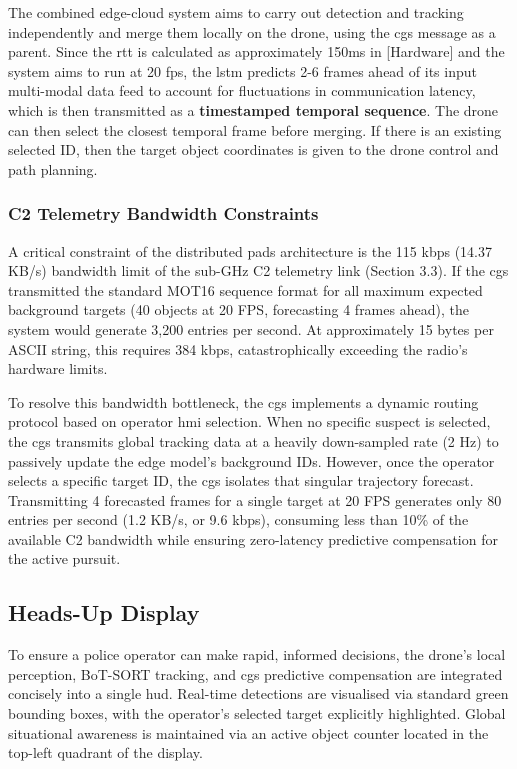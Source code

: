 \documentclass{report_template_oxford}
\begin{document}
The combined  edge-cloud system aims to carry out detection and tracking independently and merge them locally on the drone, using the \gls{cgs} message as a parent. Since the \gls{rtt} is calculated as approximately 150ms in [Hardware] and the system aims to run at 20 \gls{fps}, the \gls{lstm} predicts 2-6 frames ahead of its input multi-modal data feed to account for fluctuations in communication latency, which is then transmitted as a \textbf{timestamped temporal sequence}. The drone can then select the closest temporal frame before merging. If there is an existing selected ID, then the target object coordinates is given to the drone control and path planning. 

\subsubsection{C2 Telemetry Bandwidth Constraints}
A critical constraint of the distributed \gls{pads} architecture is the 115 kbps (14.37 KB/s) bandwidth limit of the sub-GHz C2 telemetry link (Section 3.3). If the \gls{cgs} transmitted the standard MOT16 sequence format for all maximum expected background targets (40 objects at 20 FPS, forecasting 4 frames ahead), the system would generate 3,200 entries per second. At approximately 15 bytes per ASCII string, this requires 384 kbps, catastrophically exceeding the radio's hardware limits. 

To resolve this bandwidth bottleneck, the \gls{cgs} implements a dynamic routing protocol based on operator \gls{hmi} selection. When no specific suspect is selected, the \gls{cgs} transmits global tracking data at a heavily down-sampled rate (2 Hz) to passively update the edge model's background IDs. However, once the operator selects a specific target ID, the \gls{cgs} isolates that singular trajectory forecast. Transmitting 4 forecasted frames for a single target at 20 FPS generates only 80 entries per second (1.2 KB/s, or 9.6 kbps), consuming less than 10\% of the available C2 bandwidth while ensuring zero-latency predictive compensation for the active pursuit.


\subsection{Heads-Up Display} \label{hud}
To ensure a police operator can make rapid, informed decisions, the drone’s local perception, BoT-SORT \cite{botsort} tracking, and \gls{cgs} predictive compensation are integrated concisely into a single \gls{hud}. Real-time detections are visualised via standard green bounding boxes, with the operator's selected target explicitly highlighted. Global situational awareness is maintained via an active object counter located in the top-left quadrant of the display.
\end{document}
